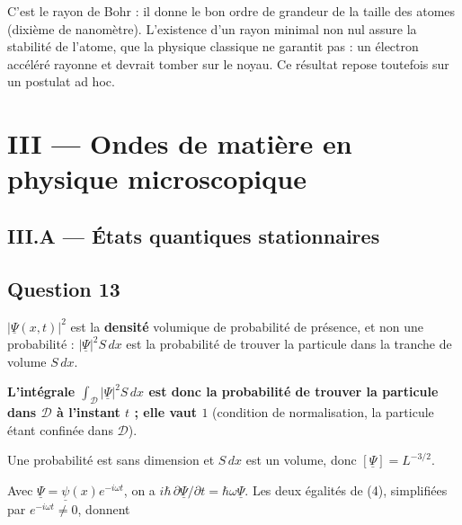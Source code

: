 \documentclass[11pt,a4paper]{article}
\newcommand{\equationajustee}[1]{%
  \sbox{\boiteequation}{$\displaystyle #1$}%
  \ifdim\wd\boiteequation>\linewidth
    \[\resizebox{\linewidth}{!}{\usebox{\boiteequation}}\]%
  \else
    \[#1\]%
  \fi}
\begin{document}
\equationajustee{\boxed{r_{c,\min}\simeq5\times10^{-11}\ \text{m}}}

C'est le rayon de Bohr : il donne le bon ordre de grandeur de la taille des atomes (dixième de nanomètre). L'existence d'un rayon minimal non nul assure la stabilité de l'atome, que la physique classique ne garantit pas : un électron accéléré rayonne et devrait tomber sur le noyau. Ce résultat repose toutefois sur un postulat ad hoc.

\hypertarget{iii-ondes-de-matiuxe8re-en-physique-microscopique}{%
\section{III --- Ondes de matière en physique microscopique}\label{iii-ondes-de-matiuxe8re-en-physique-microscopique}}

\hypertarget{iii.a-uxe9tats-quantiques-stationnaires}{%
\subsection{III.A --- États quantiques stationnaires}\label{iii.a-uxe9tats-quantiques-stationnaires}}

\hypertarget{question-13}{%
\subsection{Question 13}\label{question-13}}

\(|\underline\Psi(x,t)|^2\) est la \textbf{densité} volumique de probabilité de présence, et non une probabilité : \(|\underline\Psi|^2S\,dx\) est la probabilité de trouver la particule dans la tranche de volume \(S\,dx\).

\textbf{L'intégrale \(\int_{\mathscr D}|\underline\Psi|^2S\,dx\) est donc la probabilité de trouver la particule dans \(\mathscr D\) à l'instant \(t\) ; elle vaut \(1\)} (condition de normalisation, la particule étant confinée dans \(\mathscr D\)).

Une probabilité est sans dimension et \(S\,dx\) est un volume, donc \(\boxed{[\underline\Psi]=L^{-3/2}}\).

Avec \(\underline\Psi=\underline\psi(x)e^{-i\omega t}\), on a \(i\hbar\,\partial\underline\Psi/\partial t=\hbar\omega\underline\Psi\). Les deux égalités de (4), simplifiées par \(e^{-i\omega t}\neq0\), donnent

\equationajustee{\begin{aligned}
\hbar\omega\,\underline\psi&=-\frac{\hbar^2}{2m}\underline\psi''+V(x)\underline\psi\\
&=E\underline\psi,
\end{aligned}}
\end{document}
